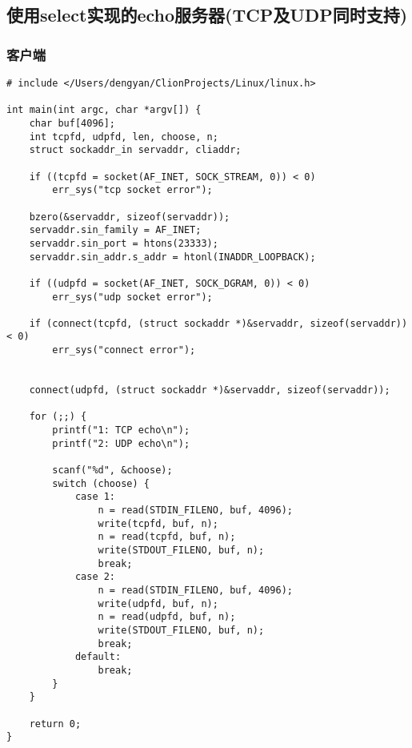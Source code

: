 \subsection{使用select实现的echo服务器(TCP及UDP同时支持)}
\subsubsection{客户端}
\begin{verbatim}
# include </Users/dengyan/ClionProjects/Linux/linux.h>

int main(int argc, char *argv[]) {
    char buf[4096];
    int tcpfd, udpfd, len, choose, n;
    struct sockaddr_in servaddr, cliaddr;

    if ((tcpfd = socket(AF_INET, SOCK_STREAM, 0)) < 0)
        err_sys("tcp socket error");

    bzero(&servaddr, sizeof(servaddr));
    servaddr.sin_family = AF_INET;
    servaddr.sin_port = htons(23333);
    servaddr.sin_addr.s_addr = htonl(INADDR_LOOPBACK);

    if ((udpfd = socket(AF_INET, SOCK_DGRAM, 0)) < 0)
        err_sys("udp socket error");

    if (connect(tcpfd, (struct sockaddr *)&servaddr, sizeof(servaddr)) < 0)
        err_sys("connect error");


    connect(udpfd, (struct sockaddr *)&servaddr, sizeof(servaddr));

    for (;;) {
        printf("1: TCP echo\n");
        printf("2: UDP echo\n");

        scanf("%d", &choose);
        switch (choose) {
            case 1:
                n = read(STDIN_FILENO, buf, 4096);
                write(tcpfd, buf, n);
                n = read(tcpfd, buf, n);
                write(STDOUT_FILENO, buf, n);
                break;
            case 2:
                n = read(STDIN_FILENO, buf, 4096);
                write(udpfd, buf, n);
                n = read(udpfd, buf, n);
                write(STDOUT_FILENO, buf, n);
                break;
            default:
                break;
        }
    }

    return 0;
}
\end{verbatim}

